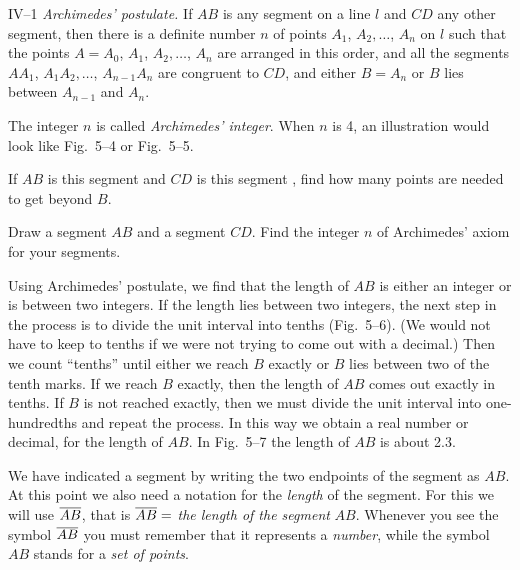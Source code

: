 \documentclass[11pt]{book}
\begin{document}
\medskip
IV--1 \emph{Archimedes' postulate.} If $AB$ is any segment on a line $l$ and
$CD$ any other segment, then there is a definite number $n$ of points
$A_1$, $A_2,\ldots$, $A_n$ on $l$ such that the points $A = A_0$, $A_1$,
$A_2,\ldots$, $A_n$ are arranged in this order, and all the segments $AA_1$,
$A_1A_2,\ldots$, $A_{n-1}A_n$ are congruent to $CD$, and either $B = A_n$ or
$B$ lies between $A_{n-1}$ and $A_n$.

\medskip
The integer $n$ is called \emph{Archimedes' integer}. When $n$ is 4, an
illustration would look like Fig.~5--4 or Fig.~5--5.

\FIGVFOURFIVE


\begin{exercisecols}
\begin{exlist}
\item If $AB$ is this segment 
      and $CD$ is this segment
      , find how many
      points are needed to get beyond $B$.
\item Draw a segment $AB$ and a segment $CD$. Find the integer $n$ of
      Archimedes' axiom for your segments.
\end{exlist}
\end{exercisecols}

Using Archimedes' postulate, we find that the length of $AB$ is either an
integer or is between two integers. If the length lies between two integers,
the next step in the process is to divide the unit interval into tenths
(Fig.~5--6). (We would not have to keep to tenths if we were not trying to come
out with a decimal.) Then we count ``tenths'' until either we reach $B$ exactly
or $B$ lies between two of the tenth marks. If we reach $B$ exactly, then the
length of $AB$ comes out exactly in tenths. If $B$ is not reached exactly, then
we must divide the unit interval into one-hundredths and repeat the process. In
this way we obtain a real number or decimal, for the length of $AB$. In
Fig.~5--7 the length of $AB$ is about 2.3.

\FIGVSIXSEVEN

We have indicated a segment by writing the two endpoints of the segment as
$AB$. At this point we also need a notation for the \emph{length} of the
segment. For this we will use $\overline{AB}$, that is $\overline{AB} = $ \emph{the length
of the segment} $AB$. Whenever you see the symbol $\overline{AB}$ you must remember
that it represents a \emph{number}, while the symbol $AB$ stands for a \emph{set
of points}.
\end{document}

